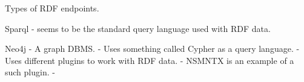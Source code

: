 Types of RDF endpoints.

Sparql
-  seems to be the standard query language used with RDF data.


Neo4j
    - A graph DBMS.
    - Uses something called Cypher as a query language.
    - Uses different plugins to work with RDF data.
        - NSMNTX is an example of a such plugin.
        - 